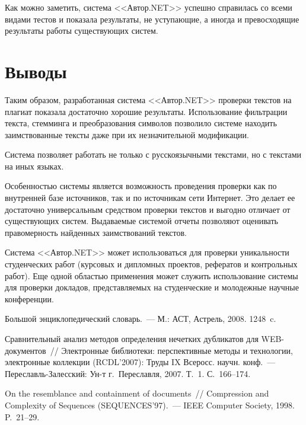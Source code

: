 \begin{multicols}{2}
  Как можно заметить, сис\-те\-ма <<Автор.NET>> успешно справилась со 
всеми видами тестов и показала результаты, не уступающие, а иногда и 
превосходящие результаты работы существующих сис\-тем. 

\section{Выводы}

  Таким образом, разработанная сис\-те\-ма <<Автор.NET>> проверки текстов 
на плагиат показала достаточно хорошие результаты. Использование 
фильтрации текста, стемминга и преобразования символов позволило 
  сис\-те\-ме находить заимствованные тексты даже при их незначительной 
модификации. 
  
  Система позволяет работать не только с русскоязычными текстами, но с 
текстами на иных языках. 
  
  Особенностью системы является возможность проведения проверки как по 
внутренней базе источников, так и по источникам сети Интернет. Это делает ее 
достаточно универсальным средством проверки текстов и выгодно отличает от 
существующих сис\-тем. Выдаваемые сис\-те\-мой отчеты позволяют оценивать 
правомерность найденных заимствований текстов. 
  
  Система <<Автор.NET>> может использоваться для проверки уникальности 
студенческих работ (курсовых и дипломных проектов, рефератов и 
контрольных работ). Еще одной областью применения может служить 
использование сис\-те\-мы для проверки докладов, представляемых на 
студенческие и молодежные научные конференции.

{\small\frenchspacing
{%
\begin{thebibliography}{99}

  Большой энциклопедический словарь.~--- М.: АСТ, Астрель, 2008. 1248~c.
  
  Сравнительный анализ методов определения нечетких дубликатов для\linebreak 
  WEB-до\-ку\-мен\-тов~// Электронные библиотеки: перспективные методы и технологии, 
электронные коллекции (RCDL'2007): Труды IX Всеросс. научн. конф.~--- 
  Пе\-ре\-славль-За\-лес\-ский: Ун-т г.~Переславля, 2007. Т.~1. С.~166--174.
  
   On the resemblance and containment of documents~// Compression and 
Complexity of Sequences (SEQUENCES'97).~--- IEEE Computer Society, 1998. P.~21--29.
  

\end{thebibliography}}}
\end{multicols}
